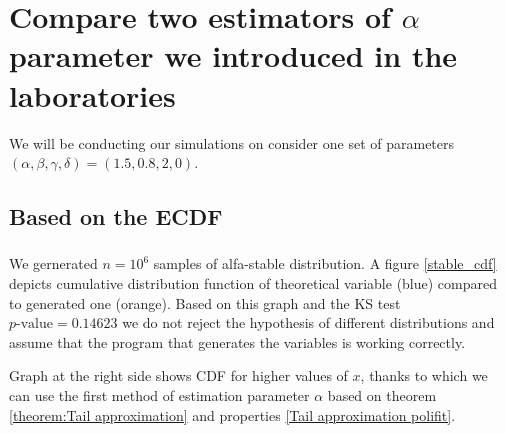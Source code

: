 \documentclass{article}
\begin{document}
		\section{Compare two estimators of $\alpha$ parameter we introduced in the laboratories}

		We will be conducting our simulations on consider one set of parameters $(\alpha, \beta , \gamma, \delta) = (1.5, 0.8, 2, 0)$.

		\subsection{Based on the ECDF}
		\subsubsection{}
		We gernerated $n = 10^6$ samples of alfa-stable distribution.
		A figure \ref{stable_cdf} depicts cumulative distribution function of theoretical variable (blue) compared to generated one (orange).
		Based on this graph  and the KS test $p\text{-value} = 0.14623$ we do not reject the hypothesis of different distributions and assume that the program that generates the variables is working correctly.
		
		Graph at the right side shows CDF for higher values of $x$, thanks to which we can use the first method of estimation parameter $\alpha$ based on theorem \ref{theorem:Tail approximation} and properties \ref{Tail approximation polifit}.    
		
\end{document}
